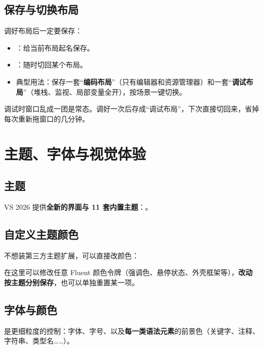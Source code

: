 \subsection{保存与切换布局}

调好布局后一定要保存：

\begin{itemize}
	\item {}：给当前布局起名保存。
	\item {}：随时切回某个布局。
	\item 典型用法：保存一套“\textbf{编码布局}”（只有编辑器和资源管理器）和一套“\textbf{调试布局}”（堆栈、监视、局部变量全开），按场景一键切换。
\end{itemize}

\begin{keybox}[实战场景]
调试时窗口乱成一团是常态。调好一次后存成“调试布局”，下次直接切回来，省掉每次重新拖窗口的几分钟。
\end{keybox}

\section{主题、字体与视觉体验}

\subsection{主题}

VS 2026 提供\textbf{全新的界面与 11 套内置主题}：。

\subsection{自定义主题颜色}

不想装第三方主题扩展，可以直接改颜色：


在这里可以修改任意 Fluent 颜色令牌（强调色、悬停状态、外壳框架等），\textbf{改动按主题分别保存}，也可以单独重置某一项。

\subsection{字体与颜色}

 是更细粒度的控制：字体、字号、以及\textbf{每一类语法元素}的前景色（关键字、注释、字符串、类型名……）。

